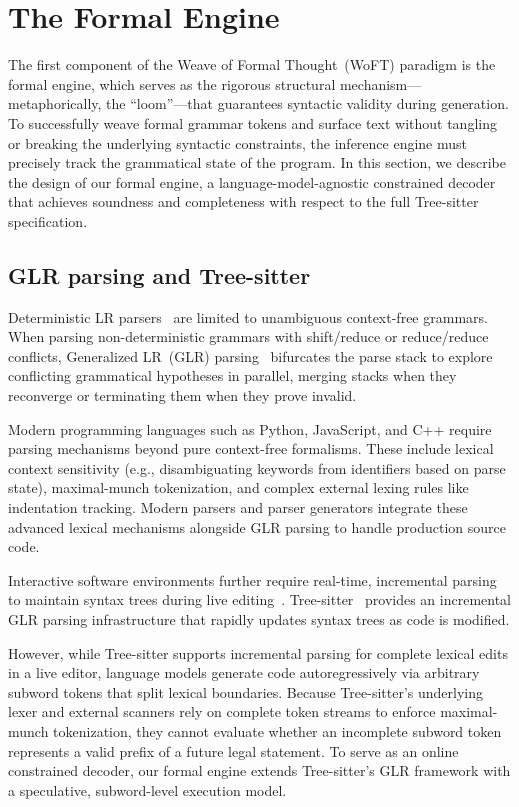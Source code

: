 \documentclass[11pt]{article}
\theoremstyle{plain}
\theoremstyle{definition}
\begin{document}
\section{The Formal Engine}
\label{sec:formal-engine}

The first component of the Weave of Formal Thought~(WoFT) paradigm is the formal
engine, which serves as the rigorous structural mechanism---metaphorically, the
``loom''---that guarantees syntactic validity during generation. To successfully
weave formal grammar tokens and surface text without tangling or breaking the
underlying syntactic constraints, the inference engine must precisely track the
grammatical state of the program. In this section, we describe the design of our
formal engine, a language-model-agnostic constrained decoder that achieves
soundness and completeness with respect to the full Tree-sitter specification.

\subsection{GLR parsing and Tree-sitter}

Deterministic LR parsers~\cite{knuth-1965} are limited to unambiguous
context-free grammars. When parsing non-deterministic grammars with shift/reduce
or reduce/reduce conflicts, Generalized LR~(GLR) parsing~\cite{tomita-1987}
bifurcates the parse stack to explore conflicting grammatical hypotheses in
parallel, merging stacks when they reconverge or terminating them when they
prove invalid.

Modern programming languages such as Python, JavaScript, and C++ require parsing
mechanisms beyond pure context-free formalisms. These include lexical context
sensitivity (e.g., disambiguating keywords from identifiers based on parse
state), maximal-munch tokenization, and complex external lexing rules like
indentation tracking. Modern parsers and parser generators integrate these
advanced lexical mechanisms alongside GLR parsing to handle production source
code.

Interactive software environments further require real-time, incremental parsing
to maintain syntax trees during live editing~\cite{incremental-parsing-1997}.
Tree-sitter~\cite{tree-sitter-2026} provides an incremental GLR parsing
infrastructure that rapidly updates syntax trees as code is modified.

However, while Tree-sitter supports incremental parsing for complete lexical
edits in a live editor, language models generate code autoregressively via
arbitrary subword tokens that split lexical boundaries. Because Tree-sitter's
underlying lexer and external scanners rely on complete token streams to enforce
maximal-munch tokenization, they cannot evaluate whether an incomplete subword
token represents a valid prefix of a future legal statement. To serve as an
online constrained decoder, our formal engine extends Tree-sitter's GLR
framework with a speculative, subword-level execution model.
\end{document}
